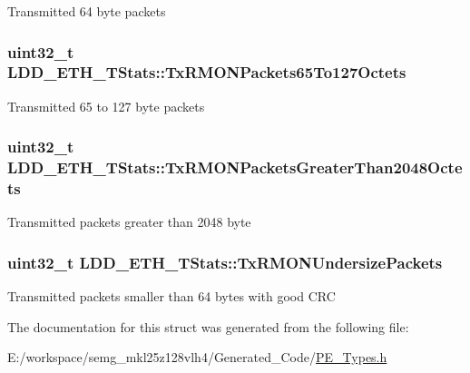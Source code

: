 Transmitted 64 byte packets \hypertarget{struct_l_d_d___e_t_h___t_stats_afd6d14f52f7a9646e7a202abd30b4aea}{
\subsubsection[{Tx\-R\-M\-O\-N\-Packets65\-To127\-Octets}]{\setlength{\rightskip}{0pt plus 5cm}uint32\-\_\-t L\-D\-D\-\_\-\-E\-T\-H\-\_\-\-T\-Stats\-::\-Tx\-R\-M\-O\-N\-Packets65\-To127\-Octets}}\label{struct_l_d_d___e_t_h___t_stats_afd6d14f52f7a9646e7a202abd30b4aea}
Transmitted 65 to 127 byte packets \hypertarget{struct_l_d_d___e_t_h___t_stats_a8f892961bd1e66bf6c75e6acec8d8816}{
\subsubsection[{Tx\-R\-M\-O\-N\-Packets\-Greater\-Than2048\-Octets}]{\setlength{\rightskip}{0pt plus 5cm}uint32\-\_\-t L\-D\-D\-\_\-\-E\-T\-H\-\_\-\-T\-Stats\-::\-Tx\-R\-M\-O\-N\-Packets\-Greater\-Than2048\-Octets}}\label{struct_l_d_d___e_t_h___t_stats_a8f892961bd1e66bf6c75e6acec8d8816}
Transmitted packets greater than 2048 byte \hypertarget{struct_l_d_d___e_t_h___t_stats_a71c3b9e66b78d20604a952804089a347}{
\subsubsection[{Tx\-R\-M\-O\-N\-Undersize\-Packets}]{\setlength{\rightskip}{0pt plus 5cm}uint32\-\_\-t L\-D\-D\-\_\-\-E\-T\-H\-\_\-\-T\-Stats\-::\-Tx\-R\-M\-O\-N\-Undersize\-Packets}}\label{struct_l_d_d___e_t_h___t_stats_a71c3b9e66b78d20604a952804089a347}
Transmitted packets smaller than 64 bytes with good C\-R\-C 

The documentation for this struct was generated from the following file\-:\begin{DoxyCompactItemize}
\item 
E\-:/workspace/semg\-\_\-mkl25z128vlh4/\-Generated\-\_\-\-Code/\hyperlink{_p_e___types_8h}{P\-E\-\_\-\-Types.\-h}\end{DoxyCompactItemize}
